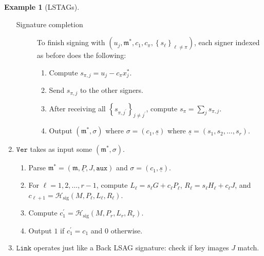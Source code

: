 \documentclass{iacrtrans}
\theoremstyle{definition}
\numberwithin{theorem}{subsection}
\numberwithin{lemma}{theorem}
\newtheorem{ex}[theorem]{Example}
\newcommand{\m}{\mathfrak{m}}
\begin{document}
\begin{ex}[LSTAGs]
\begin{enumerate}
\begin{description}
\item [Signature completion] To finish signing with $(u_j, \m^*, c_1, c_\pi, \left\{s_{\ell}\right\}_{\ell \neq \pi})$, each signer indexed as before does the following:
\begin{enumerate}
\item Compute $s_{\pi, j} = u_j - c_\pi x^*_j$.
\item Send $s_{\pi, j}$ to the other signers.%
\item After receiving all $\left\{s_{\pi, j^\prime}\right\}_{j \neq j^\prime}$, compute $s_\pi = \sum_j s_{\pi,j}$.
\item Output $(\m^*, \sigma)$ where $\sigma = (c_1, \underline{s})$ where $\underline{s} = (s_1, s_2, \ldots, s_r)$.
\end{enumerate}
\end{description}

\item $\texttt{Ver}$ takes as input some $(\mathfrak{m}^*, \sigma)$.
\begin{enumerate}
\item Parse $\mathfrak{m}^* = (\mathfrak{m}, \underline{P}, J, \texttt{aux})$ and $\sigma = (c_1, \underline{s})$.
\item For $\ell = 1, 2, \ldots, r-1$, compute $L_\ell = s_\ell G + c_\ell P_\ell$, $R_\ell = s_\ell H_\ell + c_\ell J$, and $c_{\ell+1} = \mathcal{H}_{\text{sig}}(M, P_\ell, L_\ell, R_\ell)$. 
\item Compute $c_1^\prime = \mathcal{H}_{\text{sig}}(M, P_r, L_r, R_r)$.
\item Output $1$ if $c_1^\prime = c_1$ and $0$ otherwise.
\end{enumerate}

\item $\texttt{Link}$ operates just like a Back LSAG signature: check if key images $J$ match.
\end{enumerate}

\end{ex}

\end{document}

